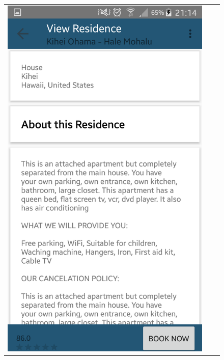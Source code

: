 \documentclass[12pt]{article}
\begin{document}
\begin{center}
\begin{figure}
\begin{tabular}{c c c }
				\includegraphics[scale=0.12, keepaspectratio]{08-Residence01.png}  
				&

\end{tabular}
\end{figure}
\end{center}
\end{document}
